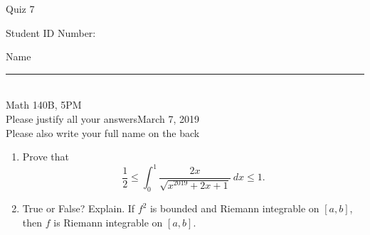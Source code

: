 \documentclass[12pt]{article}
\begin{document}
\begin{flushleft} 
\centerline{\LARGE{Quiz 7}} 
\vspace{5 mm}
{Student ID Number:}\hfill  
{Name \rule {2 in}{0.01in}}\\
Math 140B, 5PM
\\
{Please justify all your answers}\hfill {March 7, 2019}
\\
{Please also write your full name on the back} 

\medskip
\end{flushleft}

\begin{enumerate}
	\item Prove that
	\[
	\frac{1}{2}\leq \int_0^1\frac{2x}{\sqrt{x^{2019}+2x+1}}\ dx \leq 1.
	\]
	\vfill
	\item True or False? Explain. If $f^2$ is bounded and Riemann integrable on $[a,b]$, then $f$ is Riemann integrable on $[a,b]$.
	\vfill
\end{enumerate}

\end{document}
